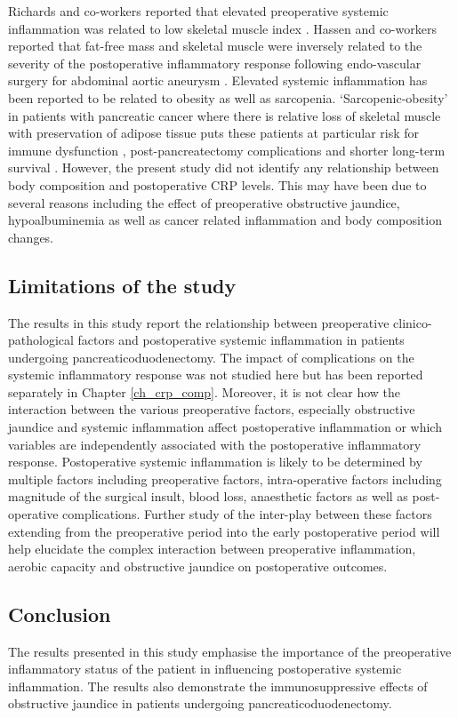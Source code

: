 Richards and co-workers reported that elevated preoperative systemic inflammation was related to low skeletal muscle index \parencite{richards_relationships_2012}.
Hassen and co-workers reported that fat-free mass and skeletal muscle were inversely related to the severity of the postoperative inflammatory response following endo-vascular surgery for abdominal aortic aneurysm \parencite{hassen_preoperative_2007}.
Elevated systemic inflammation has been reported to be related to obesity as well as sarcopenia. 
`Sarcopenic-obesity' in patients with pancreatic cancer where there is relative loss of skeletal muscle with preservation of adipose tissue puts these patients at particular risk for immune dysfunction \parencite{berg_adipose_2005, reisinger_sarcopenia_2015}, post-pancreatectomy complications \parencite{joglekar_sarcopenia_2015} and shorter long-term survival \parencite{tan_sarcopenia_2009, peng_impact_2012}.
However, the present study did not identify any relationship between body composition and postoperative CRP levels.
This may have been due to several reasons including the effect of preoperative obstructive jaundice, hypoalbuminemia as well as cancer related inflammation and body composition changes. 

\subsection{Limitations of the study}

The results in this study report the relationship between preoperative clinico-pathological factors and postoperative systemic inflammation in patients undergoing pancreaticoduodenectomy. 
The impact of complications on the systemic inflammatory response was not studied here but has been reported separately in Chapter \ref{ch_crp_comp}. 
Moreover, it is not clear how the interaction between the various preoperative factors, especially obstructive jaundice and systemic inflammation affect postoperative inflammation or which variables are independently associated with the postoperative inflammatory response.
Postoperative systemic inflammation is likely to be determined by multiple factors including preoperative factors, intra-operative factors including magnitude of the surgical insult, blood loss, anaesthetic factors as well as post-operative complications.
Further study of the inter-play between these factors extending from the preoperative period into the early postoperative period will help elucidate the complex interaction between preoperative inflammation, aerobic capacity and obstructive jaundice on postoperative outcomes. 

\subsection{Conclusion}
The results presented in this study emphasise the importance of the preoperative inflammatory status of the patient in influencing postoperative systemic inflammation. 
The results also demonstrate the immunosuppressive effects of obstructive jaundice in patients undergoing pancreaticoduodenectomy. 


